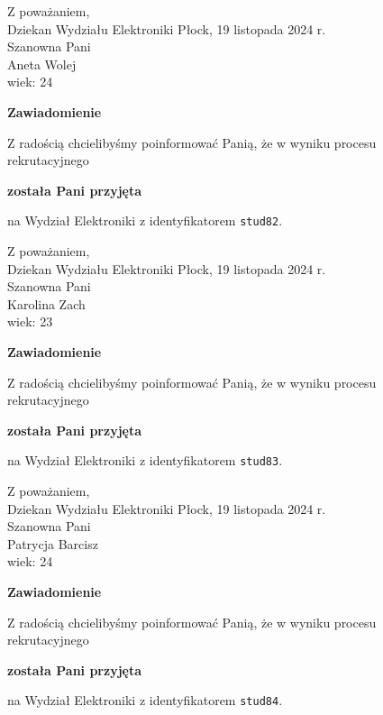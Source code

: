 \documentclass[12pt,a4paper]{article}
\begin{document}
\noindent
Z poważaniem,\\
Dziekan
Wydziału Elektroniki
\newpage
\hfill Płock, 19 listopada 2024 r.\\ 
\noindent 
Szanowna Pani \\
Aneta Wolej \\
wiek: 24

\bigskip

\begin{center}
{\Large\textbf{Zawiadomienie}}
\end{center}
\bigskip
Z radością chcielibyśmy poinformować Panią, że w wyniku procesu rekrutacyjnego
\begin{center}
\textsf{\textbf{została Pani przyjęta}} 
\end{center}
na Wydział Elektroniki z identyfikatorem \verb|stud82|.
\vspace{2cm}

\noindent
Z poważaniem,\\
Dziekan
Wydziału Elektroniki
\newpage
\hfill Płock, 19 listopada 2024 r.\\ 
\noindent 
Szanowna Pani \\
Karolina Zach \\
wiek: 23

\bigskip

\begin{center}
{\Large\textbf{Zawiadomienie}}
\end{center}
\bigskip
Z radością chcielibyśmy poinformować Panią, że w wyniku procesu rekrutacyjnego
\begin{center}
\textsf{\textbf{została Pani przyjęta}} 
\end{center}
na Wydział Elektroniki z identyfikatorem \verb|stud83|.
\vspace{2cm}

\noindent
Z poważaniem,\\
Dziekan
Wydziału Elektroniki
\newpage
\hfill Płock, 19 listopada 2024 r.\\ 
\noindent 
Szanowna Pani \\
Patrycja Barcisz \\
wiek: 24

\bigskip

\begin{center}
{\Large\textbf{Zawiadomienie}}
\end{center}
\bigskip
Z radością chcielibyśmy poinformować Panią, że w wyniku procesu rekrutacyjnego
\begin{center}
\textsf{\textbf{została Pani przyjęta}} 
\end{center}
na Wydział Elektroniki z identyfikatorem \verb|stud84|.
\vspace{2cm}
\end{document}
